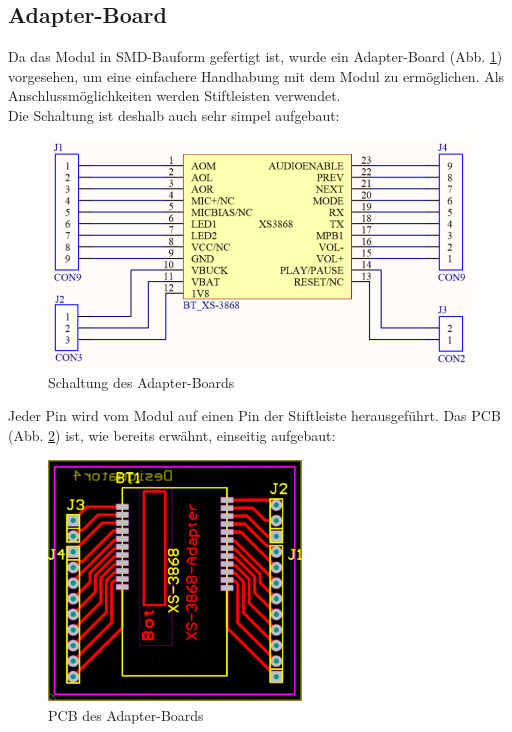 

\subsection*{Adapter-Board} \label{subsec:4.1.7}
Da das Modul in SMD-Bauform gefertigt ist, wurde ein Adapter-Board (Abb. \ref{fig:4.1.7.1}) vorgesehen, um eine einfachere Handhabung mit dem Modul zu ermöglichen.
Als Anschlussmöglichkeiten werden Stiftleisten verwendet.
\\
Die Schaltung ist deshalb auch sehr simpel aufgebaut:
\begin{figure} [H]
	\centering
	\includegraphics[width=1\textwidth]{img/BTModul/adapter_sch.png}
	\caption{Schaltung des Adapter-Boards}\label {fig:4.1.7.1}
\end{figure} 
Jeder Pin wird vom Modul auf einen Pin der Stiftleiste herausgeführt.
\newpage
Das PCB (Abb. \ref{fig:4.1.7.2}) ist, wie bereits erwähnt, einseitig aufgebaut:
\begin{figure} [H]
	\centering
	\includegraphics[width=0.6\textwidth]{img/BTModul/adapter_pcb.png}
	\caption{PCB des Adapter-Boards}\label {fig:4.1.7.2}
\end{figure} 
